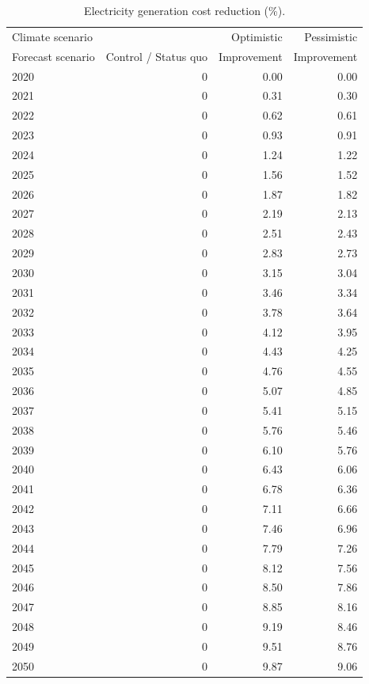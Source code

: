 \begin{table}
\caption{Electricity generation
cost reduction (\%).}
\label{tab:hydropower_impact_channel_KHM}
\centering
\begin{tabular}{lrrr}
\toprule
Climate scenario &  & Optimistic & Pessimistic \\
Forecast scenario & Control / Status quo & Improvement & Improvement \\
\midrule
2020 & 0 & 0.00 & 0.00 \\
2021 & 0 & 0.31 & 0.30 \\
2022 & 0 & 0.62 & 0.61 \\
2023 & 0 & 0.93 & 0.91 \\
2024 & 0 & 1.24 & 1.22 \\
2025 & 0 & 1.56 & 1.52 \\
2026 & 0 & 1.87 & 1.82 \\
2027 & 0 & 2.19 & 2.13 \\
2028 & 0 & 2.51 & 2.43 \\
2029 & 0 & 2.83 & 2.73 \\
2030 & 0 & 3.15 & 3.04 \\
2031 & 0 & 3.46 & 3.34 \\
2032 & 0 & 3.78 & 3.64 \\
2033 & 0 & 4.12 & 3.95 \\
2034 & 0 & 4.43 & 4.25 \\
2035 & 0 & 4.76 & 4.55 \\
2036 & 0 & 5.07 & 4.85 \\
2037 & 0 & 5.41 & 5.15 \\
2038 & 0 & 5.76 & 5.46 \\
2039 & 0 & 6.10 & 5.76 \\
2040 & 0 & 6.43 & 6.06 \\
2041 & 0 & 6.78 & 6.36 \\
2042 & 0 & 7.11 & 6.66 \\
2043 & 0 & 7.46 & 6.96 \\
2044 & 0 & 7.79 & 7.26 \\
2045 & 0 & 8.12 & 7.56 \\
2046 & 0 & 8.50 & 7.86 \\
2047 & 0 & 8.85 & 8.16 \\
2048 & 0 & 9.19 & 8.46 \\
2049 & 0 & 9.51 & 8.76 \\
2050 & 0 & 9.87 & 9.06 \\
\bottomrule
\end{tabular}
\end{table}
